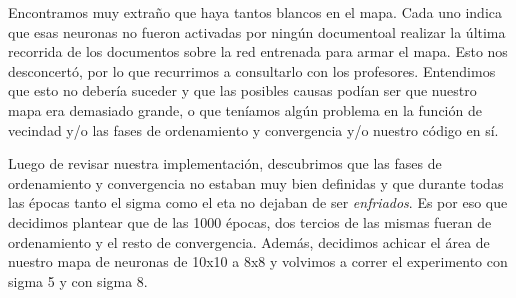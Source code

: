 Encontramos muy extraño que haya tantos blancos en el mapa. Cada uno indica que esas neuronas no fueron activadas por ningún documentoal realizar la última recorrida de los documentos sobre la red entrenada para armar el mapa. Esto nos desconcertó, por lo que recurrimos a consultarlo con los profesores. Entendimos que esto no debería suceder y que las posibles causas podían ser que nuestro mapa era demasiado grande, o que teníamos algún problema en la función de vecindad y/o las fases de ordenamiento y convergencia y/o nuestro código en sí.

Luego de revisar nuestra implementación, descubrimos que las fases de ordenamiento y convergencia no estaban muy bien definidas y que durante todas las épocas tanto el sigma como el eta no dejaban de ser \textit{enfriados}. Es por eso que decidimos plantear que de las 1000 épocas, dos tercios de las mismas fueran de ordenamiento y el resto de convergencia. Además, decidimos achicar el área de nuestro mapa de neuronas de 10x10 a 8x8 y volvimos a correr el experimento con sigma 5 y con sigma 8.

